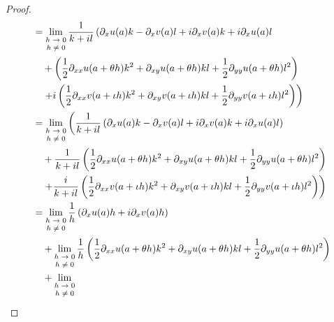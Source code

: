 \documentclass[dvipdfmx]{jsarticle}
\begin{document}
\begin{proof}
\begin{align*}
&= \lim_{\scriptsize \begin{matrix}
h \rightarrow 0 \\
h \neq 0 \\
\end{matrix}}\frac{1}{k + il}\left( \partial_{x}u(a)k - \partial_{x}v(a)l + i\partial_{x}v(a)k + i\partial_{x}u(a)l \right. \\
&\quad + \left( \frac{1}{2}\partial_{xx}u(a + \theta h)k^{2} + \partial_{xy}u(a + \theta h)kl + \frac{1}{2}\partial_{yy}u(a + \theta h)l^{2} \right) \\
&\quad \left. + i\left( \frac{1}{2}\partial_{xx}v(a + \iota h)k^{2} + \partial_{xy}v(a + \iota h)kl + \frac{1}{2}\partial_{yy}v(a + \iota h)l^{2} \right) \right)\\
&= \lim_{\scriptsize \begin{matrix}
h \rightarrow 0 \\
h \neq 0 \\
\end{matrix}}\left( \frac{1}{k + il}\left( \partial_{x}u(a)k - \partial_{x}v(a)l + i\partial_{x}v(a)k + i\partial_{x}u(a)l \right) \right. \\
&\quad + \frac{1}{k + il}\left( \frac{1}{2}\partial_{xx}u(a + \theta h)k^{2} + \partial_{xy}u(a + \theta h)kl + \frac{1}{2}\partial_{yy}u(a + \theta h)l^{2} \right) \\
&\quad \left. + \frac{i}{k + il}\left( \frac{1}{2}\partial_{xx}v(a + \iota h)k^{2} + \partial_{xy}v(a + \iota h)kl + \frac{1}{2}\partial_{yy}v(a + \iota h)l^{2} \right) \right)\\
&= \lim_{\scriptsize \begin{matrix}
h \rightarrow 0 \\
h \neq 0 \\
\end{matrix}}{\frac{1}{h}\left( \partial_{x}u(a)h + i\partial_{x}v(a)h \right)} \\
&\quad + \lim_{\scriptsize \begin{matrix}
h \rightarrow 0 \\
h \neq 0 \\
\end{matrix}}{\frac{1}{h}\left( \frac{1}{2}\partial_{xx}u(a + \theta h)k^{2} + \partial_{xy}u(a + \theta h)kl + \frac{1}{2}\partial_{yy}u(a + \theta h)l^{2} \right)} \\
&\quad + \lim_{\scriptsize \begin{matrix}
h \rightarrow 0 \\
h \neq 0 \\

\end{matrix}}
\end{align*}
\end{proof}
\end{document}
